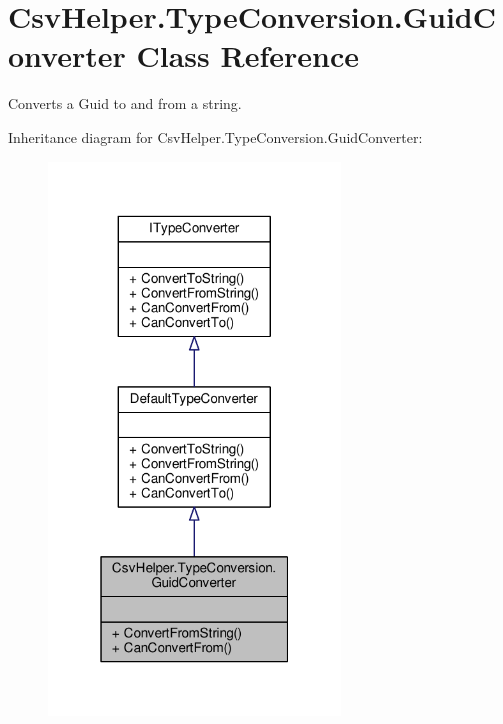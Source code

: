 \hypertarget{a00104}{\section{Csv\-Helper.\-Type\-Conversion.\-Guid\-Converter Class Reference}
\label{a00104}
}


Converts a Guid to and from a string.  




Inheritance diagram for Csv\-Helper.\-Type\-Conversion.\-Guid\-Converter\-:
\nopagebreak
\begin{figure}[H]
\begin{center}
\leavevmode
\includegraphics[width=220pt]{a00530}
\end{center}
\end{figure}


